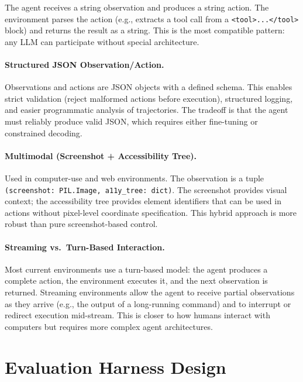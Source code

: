 The agent receives a string observation and produces a string action. The environment parses the action (e.g., extracts a tool call from a \texttt{<tool>...</tool>} block) and returns the result as a string. This is the most compatible pattern: any LLM can participate without special architecture.

\paragraph{Structured JSON Observation/Action.}
\label{structured-json-observationaction.}

Observations and actions are JSON objects with a defined schema. This enables strict validation (reject malformed actions before execution), structured logging, and easier programmatic analysis of trajectories. The tradeoff is that the agent must reliably produce valid JSON, which requires either fine-tuning or constrained decoding.

\paragraph{Multimodal (Screenshot + Accessibility Tree).}
\label{multimodal-screenshot-accessibility-tree.}

Used in computer-use and web environments. The observation is a tuple \texttt{(screenshot: PIL.Image, a11y\_tree: dict)}. The screenshot provides visual context; the accessibility tree provides element identifiers that can be used in actions without pixel-level coordinate specification. This hybrid approach is more robust than pure screenshot-based control.

\paragraph{Streaming vs.~Turn-Based Interaction.}
\label{streaming-vs.-turn-based-interaction.}

Most current environments use a turn-based model: the agent produces a complete action, the environment executes it, and the next observation is returned. Streaming environments allow the agent to receive partial observations as they arrive (e.g., the output of a long-running command) and to interrupt or redirect execution mid-stream. This is closer to how humans interact with computers but requires more complex agent architectures.

\section{Evaluation Harness Design}
\label{sec:eval-harness}

